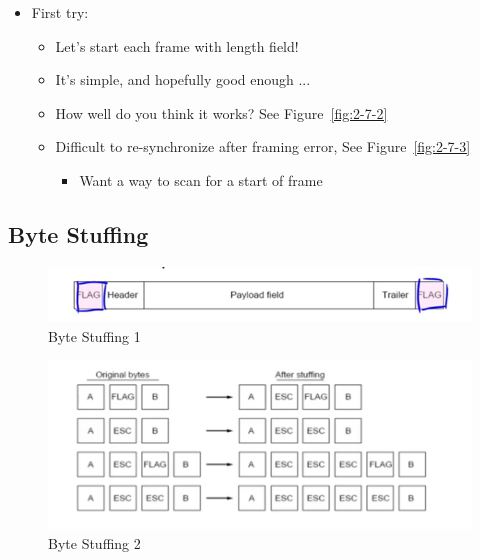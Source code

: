 \documentclass[12pt]{ctexart}   %
\begin{document}
	\begin{itemize}
		\item First try:
		\begin{itemize}
			\item Let's start each frame with length field!
			\item It's simple, and hopefully good enough ...
			\item How well do you think it works? See Figure~\ref{fig:2-7-2}
			\item Difficult to re-synchronize after framing error, See Figure~\ref{fig:2-7-3}
			\begin{itemize}
				\item Want a way to scan for a start of frame
			\end{itemize}						
		\end{itemize}
	\end{itemize}
	
	\subsection{Byte Stuffing}
	
	\begin{figure}[h!] %
	\centering
	 \includegraphics[scale=0.7]{images/2-7-4}
	\caption{Byte Stuffing 1}
	 \label{fig:2-7-4}
	 \end{figure}
	 
	 \begin{figure}[h!] %
	\centering
	 \includegraphics[scale=0.7]{images/2-7-5}
	\caption{Byte Stuffing 2}
	 \label{fig:2-7-5}
	 \end{figure}
	
\end{document}
